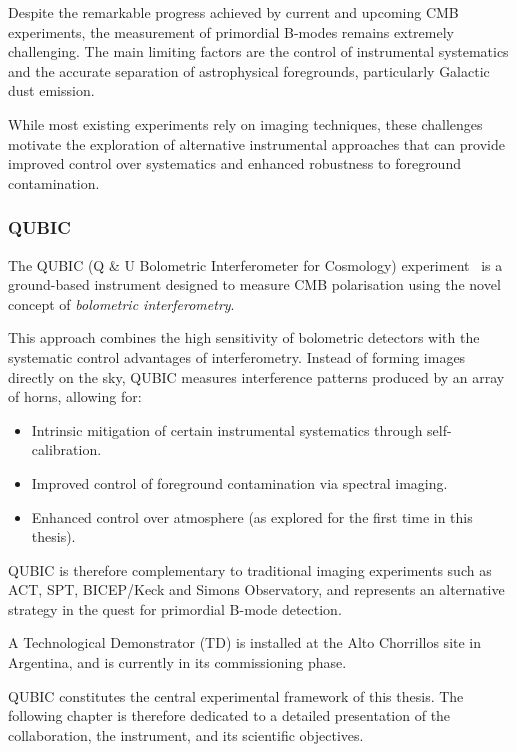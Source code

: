 \documentclass[../../thesis.tex]{subfiles}
\begin{document}
Despite the remarkable progress achieved by current and upcoming CMB experiments, the measurement of primordial B-modes remains extremely challenging. The main limiting factors are the control of instrumental systematics and the accurate separation of astrophysical foregrounds, particularly Galactic dust emission. 

While most existing experiments rely on imaging techniques, these challenges motivate the exploration of alternative instrumental approaches that can provide improved control over systematics and enhanced robustness to foreground contamination.

\subsubsection{QUBIC}

The QUBIC (Q \& U Bolometric Interferometer for Cosmology) experiment~\cite{QUBICI} is a ground-based instrument designed to measure CMB polarisation using the novel concept of \textit{bolometric interferometry}.

This approach combines the high sensitivity of bolometric detectors with the systematic control advantages of interferometry. Instead of forming images directly on the sky, QUBIC measures interference patterns produced by an array of horns, allowing for:
\begin{itemize}
    \item Intrinsic mitigation of certain instrumental systematics through self-calibration.
    \item Improved control of foreground contamination via spectral imaging.
    \item Enhanced control over atmosphere (as explored for the first time in this thesis).
\end{itemize}

QUBIC is therefore complementary to traditional imaging experiments such as ACT, SPT, BICEP/Keck and Simons Observatory, and represents an alternative strategy in the quest for primordial B-mode detection.

A Technological Demonstrator (TD) is installed at the Alto Chorrillos site in Argentina, and is currently in its commissioning phase.

\medskip

\noindent
QUBIC constitutes the central experimental framework of this thesis. The following chapter is therefore dedicated to a detailed presentation of the collaboration, the instrument, and its scientific objectives.

\end{document}
